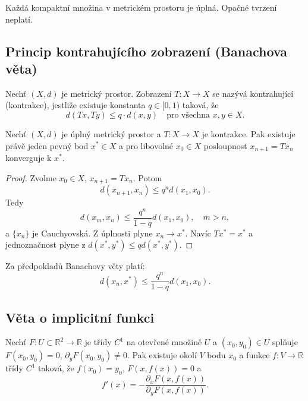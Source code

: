 \begin{theorem}
\label{vet:uplnost-kompaktnost}
Každá kompaktní množina v metrickém prostoru je úplná. Opačné tvrzení neplatí.
\end{theorem}

\subsection{Princip kontrahujícího zobrazení (Banachova věta)}
\label{sec:banach-veta}

\begin{definition}
\label{def:kontrakce}
Nechť $(X,d)$ je metrický prostor. Zobrazení $T: X \to X$ se nazývá kontrahující (kontrakce), jestliže existuje konstanta $q \in [0,1)$ taková, že
\[
d(Tx, Ty) \leq q \cdot d(x,y) \quad \text{pro všechna } x,y \in X.
\]
\end{definition}

\begin{theorem}
\label{vet:banach}
Nechť $(X,d)$ je úplný metrický prostor a $T: X \to X$ je kontrakce. Pak existuje právě jeden pevný bod $x^* \in X$ a pro libovolné $x_0 \in X$ posloupnost $x_{n+1} = Tx_n$ konverguje k $x^*$.
\end{theorem}

\begin{proof}
Zvolme $x_0 \in X$, $x_{n+1} = Tx_n$. Potom
\[
d(x_{n+1}, x_n) \leq q^n d(x_1,x_0).
\]
Tedy
\[
d(x_m, x_n) \leq \frac{q^n}{1-q} d(x_1,x_0), \quad m>n,
\]
a $\{x_n\}$ je Cauchyovská. Z úplnosti plyne $x_n \to x^*$. Navíc $Tx^* = x^*$ a jednoznačnost plyne z $d(x^*,y^*) \leq q d(x^*,y^*)$.
\end{proof}

\begin{corollary}
\label{dusl:rychlost-konvergence}
Za předpokladů Banachovy věty platí:
\[
d(x_n, x^*) \leq \frac{q^n}{1-q} d(x_1, x_0).
\]
\end{corollary}

\subsection{Věta o implicitní funkci}
\label{sec:implicitni-funkce}

\begin{theorem}
\label{vet:implicitni}
Nechť $F: U \subset \mathbb{R}^2 \to \mathbb{R}$ je třídy $C^1$ na otevřené množině $U$ a $(x_0, y_0) \in U$ splňuje $F(x_0,y_0)=0$, $\partial_y F(x_0,y_0)\neq 0$. Pak existuje okolí $V$ bodu $x_0$ a funkce $f: V \to \mathbb{R}$ třídy $C^1$ taková, že $f(x_0)=y_0$, $F(x,f(x))=0$ a
\[
f'(x) = -\frac{\partial_x F(x,f(x))}{\partial_y F(x,f(x))}.
\]
\end{theorem}

